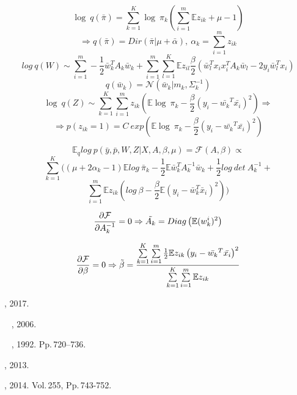 \documentclass[12pt,twoside]{article}
\begin{document}
$$\log~q(\bar{\pi}) = \sum\limits_{k=1}^K \log~\pi_k\left( \sum\limits_{i=1}^m\mathbb{E}z_{ik}+\mu-1\right)$$
$$ \Rightarrow q(\bar{\pi}) = Dir(\bar{\pi}|\mu + \bar{\alpha}),~ \alpha_k=\sum\limits_{i=1}^m z_{ik}$$
$$log~q(W) \sim \sum\limits_{i=1}^m-\frac{1}{2}\bar{w}_k^TA_k\bar{w}_k + \sum\limits_{i=1}^m \sum\limits_{l=1}^K \mathbb{E}z_{il}\frac{\beta}{2}\left(\bar{w}_l^Tx_ix_i^TA_k\bar{w}_l - 2y_i\bar{w}_l^Tx_i\right)$$
$$q(\bar{w}_k) = \mathcal{N}(\bar{w}_k|m_k, \Sigma_k^{-1})$$
$$\log~q(Z) \sim \sum \limits_{k=1}^{K} \sum \limits_{i=1}^{m} z_{ik} \left(\mathbb{E} \log~\pi_k - \frac{\beta}{2}(y_i-\bar{w_k}^T \bar{x_i})^2 \right) \Rightarrow$$
$$\Rightarrow p(z_{ik} = 1) = C~exp \left(\mathbb{E} \log~\pi_k -  \frac{\beta}{2}(y_i-\bar{w_k}^T \bar{x_i})^2 \right)$$

$$\mathbb{E}_q log~p(\bar{y}, \bar{p}, W, Z|X, A, \beta, \mu) = \mathcal{F}(A, \beta) \propto$$
$$\sum \limits_{k = 1}^K ((\mu +2\alpha_k - 1)\mathbb{E} log~\bar \pi_k - \frac{1}{2} \mathbb{E}\bar w_k^T A_k^{-1} \bar w_k + \frac{1}{2} log~det~A_k^{-1} +$$
$$\sum \limits_{i=1}^{m} \mathbb{E}z_{ik}(log~\beta - \frac{\beta}{2} \mathbb{E}(y_i - \bar w_k^T \bar x_i)^2))$$

$$\frac{\partial \mathcal{F}}{\partial A_k^{-1}} = 0 \Rightarrow \Tilde{A_k} = Diag\left(\mathbb{E} (w_k^i)^2\right)$$

$$\frac{\partial \mathcal{F}}{\partial \beta} = 0 \Rightarrow \Tilde{\beta}  =  \frac{\sum \limits_{k=1}^{K} \sum \limits_{i=1}^{m} \frac{1}{2} \mathbb{E}z_{ik} \left(y_i - \bar{w_k}^T \bar{x_i} \right)^2}{\sum \limits_{k=1}^{K} \sum \limits_{i=1}^{m} \mathbb{E}z_{ik}}$$

\begin{thebibliography}{99}
    , 2017.

    ~
    , 2006.

    ~
    , 1992. Pp.\,720--736.

    , 2013.

    , 2014. Vol.\,255, Pp.\,743-752.
\end{thebibliography}
\end{document}
